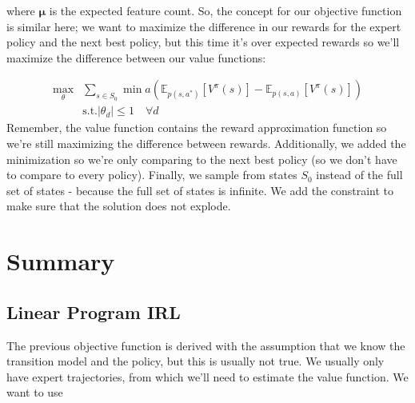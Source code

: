 \documentclass[11pt]{article}
\DeclareMathOperator*{\minimize}{min}
\DeclareMathOperator*{\maximize}{max}
\begin{document}
where $\boldsymbol{\mu}$ is the expected feature count. So, the concept for our objective function is similar here; we want to maximize the difference in our rewards for the expert policy and the next best policy, but this time it's over expected rewards so we'll maximize the difference between our value functions:


\begin{equation}
        \begin{split}
            \displaystyle \maximize_{\theta} & \sum_{s \in S_0} \minimize{a}(\mathbb{E}_{p(s,a^*)}[V^{\pi}(s)] - \mathbb{E}_{p(s,a)}[V^{\pi}(s)]) \\
             & \textrm{s.t.} |\theta_d| \leq 1 \quad \forall d 
        \end{split}
    \end{equation}
Remember, the value function contains the reward approximation function so we're still maximizing the difference between rewards. Additionally, we added the minimization so we're only comparing to the next best policy (so we don't have to compare to every policy). Finally, we sample from states $S_0$ instead of the full set of states - because the full set of states is infinite. We add the constraint to make sure that the solution does not explode.





\section{Summary}

\subsection{Linear Program IRL}
The previous objective function is derived with the assumption that we know the transition model and the policy, but this is usually not true. We usually only have expert trajectories, from which we'll need to estimate the value function. We want to use 
\end{document}
